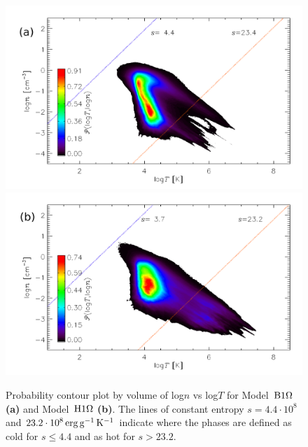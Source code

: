   \begin{figure}
  \centering
  \includegraphics[width=0.9\linewidth]{fig/o1pr_pdf2dtn.png}  
  \includegraphics[width=0.9\linewidth]{fig/o1ph_pdf2dtn.png}
    \caption[2D probability distribution of $n$ and $T$ for Models~$\Ompa$ and $\Omph$]{
  Probability contour plot by volume of log$n$ vs log$T$ for Model~$\Ompa$
  {\textbf{(a)}}
  and Model~$\Omph$ {\textbf{(b)}}.
  The lines of constant entropy $s=4.4\cdot10^{8}$ 
  and $23.2\cdot10^{8}\,{\rm erg}\,{\rm g}^{-1}\,{\rm K}^{-1}$ indicate where the phases are defined
  as cold for $s\le4.4$ and as hot for $s>23.2$. 
  \label{fig:b2dv}
    }
  \end{figure}

